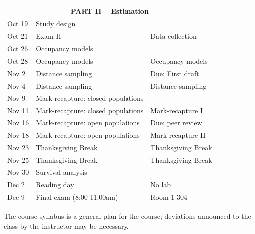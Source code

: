 \documentclass[12pt]{article}
\begin{document}
\begin{center}
\begin{tabular}[c]{lll}
\hline
           \multicolumn{3}{c}{PART II -- Estimation}                            \\
\hline
Oct 19     & Study design                       &                               \\
Oct 21     & Exam II                            & Data collection               \\
\hline
Oct 26     & Occupancy models                   &                               \\
Oct 28     & Occupancy models                   & Occupancy models              \\
\hline
Nov 2      & Distance sampling                  & Due: First draft              \\
Nov 4      & Distance sampling                  & Distance sampling             \\
\hline
Nov 9      & Mark-recapture: closed populations &                               \\
Nov 11     & Mark-recapture: closed populations & Mark-recapture I              \\
\hline
Nov 16     & Mark-recapture: open populations   & Due: peer review              \\
Nov 18     & Mark-recapture: open populations   & Mark-recapture II             \\
\hline
Nov 23     & Thanksgiving Break                 & Thanksgiving Break            \\
Nov 25     & Thanksgiving Break                 & Thanksgiving Break            \\
\hline
Nov 30     & Survival analysis                  &                               \\
Dec 2      & Reading day                        & No lab                        \\
\hline
Dec 9      & Final exam (8:00-11:00am)          & Room 1-304                    \\
\hline \hline
\end{tabular}
\end{center}

The course syllabus is a general plan for the course; deviations announced to the class by the instructor may be necessary.
\end{document}
